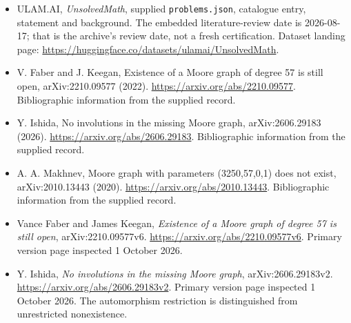\documentclass[11pt,a4paper]{article}
\begin{document}
{\small

\begin{itemize}

\item[\hypertarget{source:statement:1}{S1}] ULAM.AI, \emph{UnsolvedMath}, supplied \texttt{problems.json}, catalogue entry, statement and background. The embedded literature-review date is 2026-08-17; that is the archive’s review date, not a fresh certification. Dataset landing page: \url{https://huggingface.co/datasets/ulamai/UnsolvedMath}.

\item[\hypertarget{source:statement:2}{S2}] V. Faber and J. Keegan, Existence of a Moore graph of degree 57 is still open, arXiv:2210.09577 (2022). \url{https://arxiv.org/abs/2210.09577}. Bibliographic information from the supplied record.

\item[\hypertarget{source:statement:3}{S3}] Y. Ishida, No involutions in the missing Moore graph, arXiv:2606.29183 (2026). \url{https://arxiv.org/abs/2606.29183}. Bibliographic information from the supplied record.

\item[\hypertarget{source:statement:4}{S4}] A. A. Makhnev, Moore graph with parameters (3250,57,0,1) does not exist, arXiv:2010.13443 (2020). \url{https://arxiv.org/abs/2010.13443}. Bibliographic information from the supplied record.


\item[E1] Vance Faber and James Keegan,
\emph{Existence of a Moore graph of degree 57 is still open},
arXiv:2210.09577v6. \url{https://arxiv.org/abs/2210.09577v6}.
Primary version page inspected 1 October 2026.
\item[E2] Y. Ishida, \emph{No involutions in the missing Moore graph},
arXiv:2606.29183v2. \url{https://arxiv.org/abs/2606.29183v2}.
Primary version page inspected 1 October 2026. The automorphism
restriction is distinguished from unrestricted nonexistence.

\end{itemize}

}

\label{end:statement}
\end{document}
